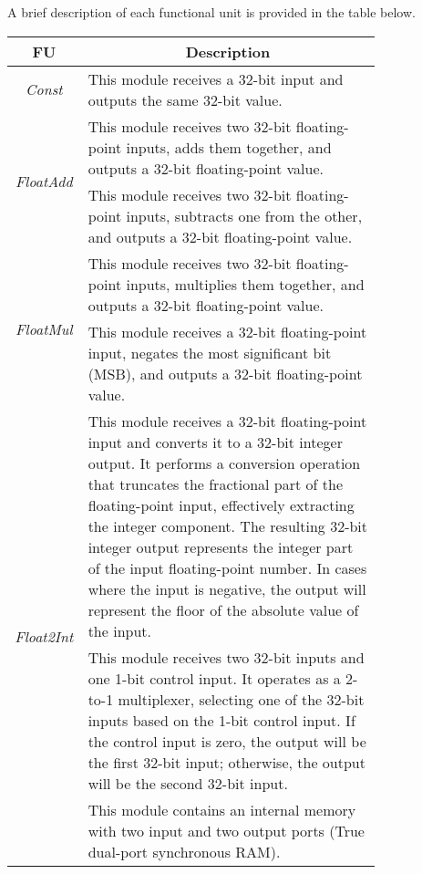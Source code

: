 A brief description of each functional unit is provided in the table below.

\begin{table}[H]
    \centering
    \begin{tabular}{|c|p{0.8\linewidth}|}
        \hline
        \multicolumn{1}{|c|}{\textbf{FU}} & \multicolumn{1}{c|}{\textbf{Description}} \\
        \hline
        \multirow{1}{*}{\textit{Const}} & This module receives a 32-bit input and outputs the same 32-bit value.  \\
        \hline
        \multirow{2}{*}{\textit{FloatAdd}} & This module receives two 32-bit floating-point inputs, adds them together, and outputs a 32-bit floating-point value. \\
        \hline
        \multirow{2}{*}{\textit{FloatSub}} & This module receives two 32-bit floating-point inputs, subtracts one from the other, and outputs a 32-bit floating-point value. \\
        \hline
        \multirow{2}{*}{\textit{FloatMul}} & This module receives two 32-bit floating-point inputs, multiplies them together, and outputs a 32-bit floating-point value. \\
        \hline
        \multirow{2}{*}{\textit{FloatNot}} & This module receives a 32-bit floating-point input, negates the most significant bit (MSB), and outputs a 32-bit floating-point value. \\
        \hline
        \multirow{6}{*}{\textit{Float2Int}} &  
        This module receives a 32-bit floating-point input and converts it to a 32-bit integer output. 
        It performs a conversion operation that truncates the fractional part of the floating-point input, effectively extracting the integer component. 
        The resulting 32-bit integer output represents the integer part of the input floating-point number. 
        In cases where the input is negative, the output will represent the floor of the absolute value of the input. \\
        \hline
        \multirow{4}{*}{\textit{Mux2}} & This module receives two 32-bit inputs and one 1-bit control input. 
        It operates as a 2-to-1 multiplexer, selecting one of the 32-bit inputs based on the 1-bit control input. 
        If the control input is zero, the output will be the first 32-bit input; otherwise, the output will be the second 32-bit input. \\
        \hline
        \multirow{7}{*}{\textit{Mem}} & This module contains an internal memory with two input and two output ports (True dual-port synchronous RAM). 

\end{tabular}
\end{table}
